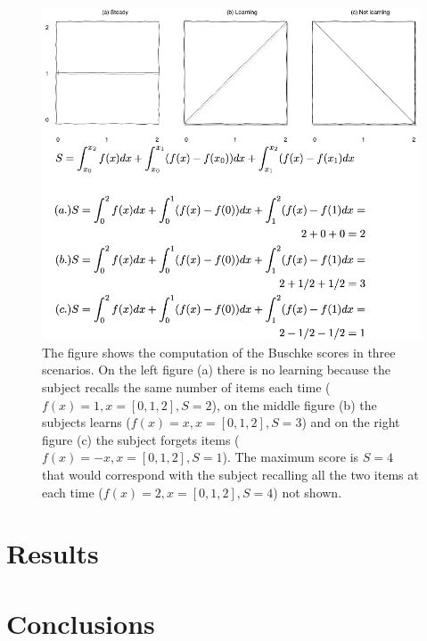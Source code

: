 \documentclass[11pt]{article}
\theoremstyle{definition}
\theoremstyle{remark}
\begin{document}
\begin{figure}[H]
        \centering
        \includegraphics[keepaspectratio, width=\linewidth]{figures/fig_buschkewitheqs}
        \caption{The figure shows the computation of the Buschke scores in three scenarios. On the left figure (a) there is no learning because the subject recalls the same number of items each time ($f(x)=1, x=[0,1,2], S=2$), on the middle figure (b) the subjects learns ($f(x)=x, x=[0,1,2], S=3$) and on the right figure (c) the subject forgets items ($f(x)=-x, x=[0,1,2], S=1$). The maximum score is $S=4$ that would correspond with the subject recalling all the two items at each time ($f(x)=2, x=[0,1,2], S=4$) not shown.} 
        \label{fig:b}
\end{figure}


\section{Results}
\label{se:res}

\section{Conclusions}
\label{se:con}

\newpage





\end{document}
